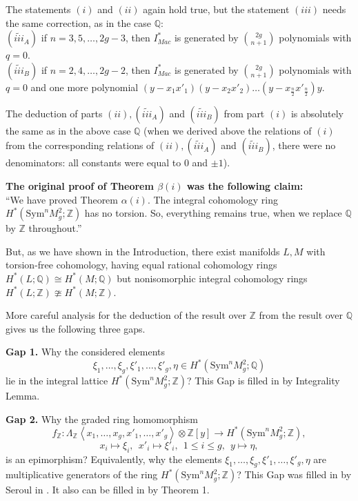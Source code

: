 \documentclass[a4paper,14pt]{article}
\newcommand{\Sym}{\mathrm{Sym}}
\newcommand{\Q}{\mathbb{Q}}
\newcommand{\Z}{\mathbb{Z}}
\begin{document}
The statements $(i)$ and $(ii)$ again hold true, but the statement $(iii)$ needs the same correction, as in the case $\Q$:\\
$(\widetilde{iii}_A)$ if $n=3,5,\dots,2g-3$, then $I^*_{Mac}$ is generated by $\binom{2g}{n+1}$ polynomials with $q=0$.\\
$(\widetilde{iii}_B)$ if $n=2,4,\dots,2g-2$, then $I^*_{Mac}$ is generated by $\binom{2g}{n+1}$ polynomials with $q=0$ and one more polynomial $(y-x_1x'_1)(y-x_2x'_2)\ldots(y-x_{\frac{n}{2}}x'_{\frac{n}{2}})y$.

The deduction of parts $(ii), (\widetilde{iii}_A)$ and $(\widetilde{iii}_B)$ from part $(i)$ is absolutely the same as in the above case $\Q$ (when we derived above the relations of $(i)$ from the corresponding relations of $(ii), (\widetilde{iii}_A)$ and $(\widetilde{iii}_B)$, there were no denominators: all constants were equal to $0$ and $\pm1$).

{\bf The original proof of Theorem $\beta (i)$ was the following claim:}\\
``We have proved Theorem $\alpha (i)$. The integral cohomology ring $H^*(\Sym^n M^2_g;\Z)$ has no torsion. So, everything remains true, when we replace $\Q$ by $\Z$ throughout.''

But, as we have shown in the Introduction, there exist manifolds $L, M$ with torsion-free cohomology, having equal rational cohomology rings $H^*(L;\Q)\cong H^*(M;\Q)$ but nonisomorphic integral cohomology rings $H^*(L;\Z)\ncong H^*(M;\Z)$. 

More careful analysis for the deduction of the result over $\Z$ from the result over $\Q$ gives us the following three gaps. 

{\bf Gap 1.} Why the considered elements
$$
\xi_1,\ldots,\xi_g,\xi'_1,\ldots,\xi'_g,\eta \in H^*(\Sym^n M^2_g;\Q)
$$
lie in the integral lattice $H^*(\Sym^n M^2_g;\Z)$? This Gap is filled in by Integrality Lemma. 

{\bf Gap 2.} Why the graded ring homomorphism 
$$
f_{\Z}: \Lambda_{\Z} \left< x_1,\ldots,x_g,x'_1,\ldots,x'_g \right>\otimes \Z[y] \to H^*(\Sym^n M^2_g;\Z),
$$
$$
x_i \mapsto \xi_i, \ \  x'_i \mapsto \xi'_i, \ \ 1\le i\le g, \ \ y \mapsto \eta,
$$
is an epimorphism? Equivalently, why the elements $\xi_1,\ldots,\xi_g,\xi'_1,\ldots,\xi'_g,\eta$ are multiplicative generators of the ring $H^*(\Sym^n M^2_g;\Z)$? This Gap was filled in by Seroul in \cite{Ser}. It also can be filled in by Theorem 1. 
\end{document}
